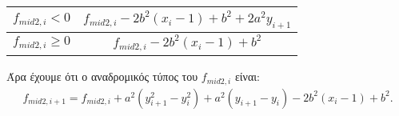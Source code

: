 \documentclass{article}
\begin{document}
\begin{center}
    \begin{tabular}{ |c|c| } 
        \hline
        $f_{mid2,i}<0$ &$ f_{mid2,i} -2b^2 (x_{i}-1) + b^2 + 2a^2 y_{i+1}$\\
        \hline
        $f_{mid2,i} \geq 0$ &$ f_{mid2,i} -2b^2 (x_{i}-1) + b^2 $\\
        \hline  
    \end{tabular}
\end{center}
Άρα έχουμε ότι ο αναδρομικός τύπος του $f_{mid2,i}$ είναι:
\begin{gather*}
   f_{mid2,i+1} = f_{mid2,i} + a^2 (y^2_{i+1} - y^2_{i}) + a^2 (y_{i+1} - y_{i}) -2b^2 (x_{i}-1) + b^2.
\end{gather*}
\end{document}
